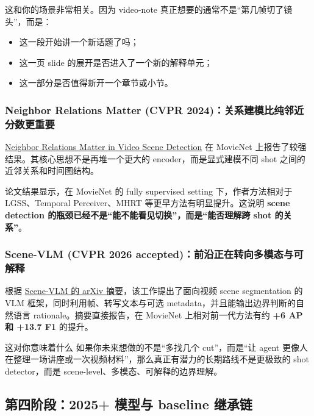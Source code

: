 \documentclass[a4paper]{article}
\begin{document}
这和你的场景非常相关。因为 video-note 真正想要的通常不是“第几帧切了镜头”，而是：

\begin{itemize}
\item 这一段开始讲一个新话题了吗；
\item 这一页 slide 的展开是否进入了一个新的解释单元；
\item 这一部分是否值得新开一个章节或小节。
\end{itemize}

\subsubsection{Neighbor Relations Matter (CVPR 2024)：关系建模比纯邻近分数更重要}

\href{https://openaccess.thecvf.com/content/CVPR2024/html/Tan_Neighbor_Relations_Matter_in_Video_Scene_Detection_CVPR_2024_paper.html}{Neighbor Relations Matter in Video Scene Detection} 在 MovieNet 上报告了较强结果。其核心思想不是再堆一个更大的 encoder，而是显式建模不同 shot 之间的近邻关系和时间图结构。

论文结果显示，在 MovieNet 的 fully supervised setting 下，作者方法相对于 LGSS、Temporal Perceiver、MHRT 等更早方法有明显提升。这说明 \textbf{scene detection 的瓶颈已经不是“能不能看见切换”，而是“能否理解跨 shot 的关系”}。

\subsubsection{Scene-VLM (CVPR 2026 accepted)：前沿正在转向多模态与可解释}

根据 \href{https://arxiv.org/abs/2512.21778}{Scene-VLM 的 arXiv 摘要}，该工作提出了面向视频 scene segmentation 的 VLM 框架，同时利用帧、转写文本与可选 metadata，并且能输出边界判断的自然语言 rationale。摘要直接报告，在 MovieNet 上相对前一代方法有约 \textbf{+6 AP 和 +13.7 F1} 的提升。

\begin{findingbox}{这对你意味着什么}
如果你未来想做的不是“多找几个 cut”，而是“让 agent 更像人在整理一场讲座或一次视频材料”，那么真正有潜力的长期路线不是更极致的 shot detector，而是 scene-level、多模态、可解释的边界理解。
\end{findingbox}

\subsection{第四阶段：2025+ 模型与 baseline 继承链}
\end{document}
